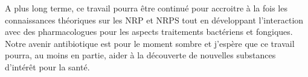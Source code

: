 A plus long terme, ce travail pourra être continué pour accroitre à la fois les connaissances théoriques sur les NRP et NRPS tout en développant l'interaction avec des pharmacologues pour les aspects traitements bactériens et fongiques.
Notre avenir antibiotique est pour le moment sombre et j'espère que ce travail pourra, au moins en partie, aider à la découverte de nouvelles substances d'intérêt pour la santé.

























